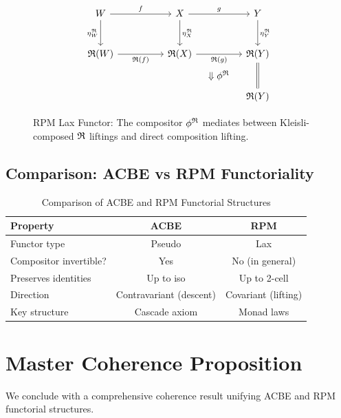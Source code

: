 \begin{figure}[ht]
\centering
\[
\begin{tikzcd}[row sep=large, column sep=huge]
  W
    \arrow[r, "f"]
    \arrow[d, "\eta^\RPM_W"']
  &
  X
    \arrow[r, "g"]
    \arrow[d, "\eta^\RPM_X"]
  &
  Y
    \arrow[d, "\eta^\RPM_Y"]
  \\
  \RPM(W)
    \arrow[r, "\RPM(f)"']
  &
  \RPM(X)
    \arrow[r, "\RPM(g)"']
    \arrow[dr, phantom, "\Downarrow \phi^\RPM"]
  &
  \RPM(Y)
  \\
  &
  &
  \RPM(Y)
    \arrow[u, equal]
\end{tikzcd}
\]
\caption{RPM Lax Functor: The compositor $\phi^{\mathfrak{R}}$ mediates between
Kleisli-composed $\mathfrak{R}$ liftings and direct composition lifting.}
\label{fig:rpm-lax-functor}
\end{figure}

\subsection{Comparison: ACBE vs RPM Functoriality}

\begin{table}[ht]
\centering
\begin{tabular}{|l|c|c|}
\hline
\textbf{Property} & \textbf{ACBE} & \textbf{RPM} \\
\hline
Functor type & Pseudo & Lax \\
Compositor invertible? & Yes & No (in general) \\
Preserves identities & Up to iso & Up to 2-cell \\
Direction & Contravariant (descent) & Covariant (lifting) \\
Key structure & Cascade axiom & Monad laws \\
\hline
\end{tabular}
\caption{Comparison of ACBE and RPM Functorial Structures}
\label{tab:acbe-rpm-comparison}
\end{table}

\section{Master Coherence Proposition}
\label{sec:master-coherence}

We conclude with a comprehensive coherence result unifying ACBE and RPM
functorial structures.

